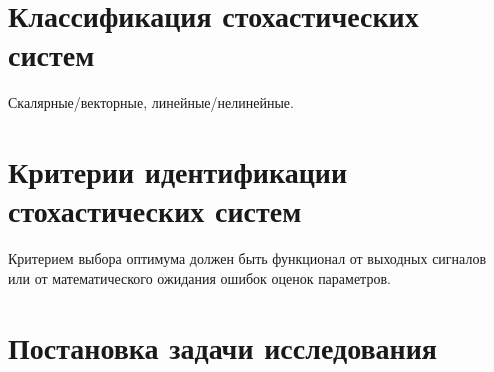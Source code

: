 \section{Классификация стохастических систем}

Скалярные/векторные, линейные/нелинейные.

\section{Критерии идентификации стохастических систем}

Критерием выбора оптимума должен быть функционал от выходных
сигналов или от математического ожидания ошибок оценок параметров.

\section{Постановка задачи исследования}

